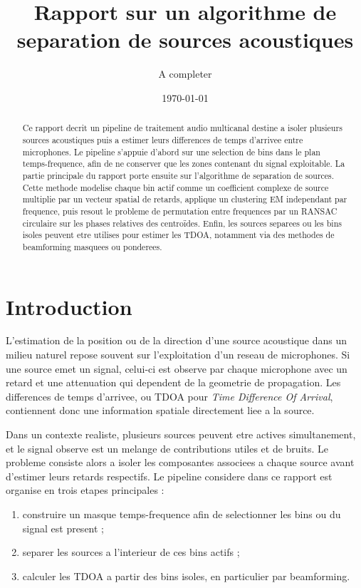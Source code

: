 \documentclass[11pt,a4paper]{article}
\title{Rapport sur un algorithme de separation de sources acoustiques}
\author{A completer}
\date{\today}
\begin{document}
\maketitle

\begin{abstract}
Ce rapport decrit un pipeline de traitement audio multicanal destine a isoler
plusieurs sources acoustiques puis a estimer leurs differences de temps
d'arrivee entre microphones. Le pipeline s'appuie d'abord sur une selection de
bins dans le plan temps-frequence, afin de ne conserver que les zones contenant
du signal exploitable. La partie principale du rapport porte ensuite sur
l'algorithme de separation de sources. Cette methode modelise chaque bin actif
comme un coefficient complexe de source multiplie par un vecteur spatial de
retards, applique un clustering EM independant par frequence, puis resout le
probleme de permutation entre frequences par un RANSAC circulaire sur les phases
relatives des centroïdes. Enfin, les sources separees ou les bins isoles peuvent etre
utilises pour estimer les TDOA, notamment via des methodes de beamforming
masquees ou ponderees.
\end{abstract}

\tableofcontents
\newpage

\section{Introduction}

L'estimation de la position ou de la direction d'une source acoustique dans un
milieu naturel repose souvent sur l'exploitation d'un reseau de microphones. Si
une source emet un signal, celui-ci est observe par chaque microphone avec un
retard et une attenuation qui dependent de la geometrie de propagation. Les
differences de temps d'arrivee, ou TDOA pour \emph{Time Difference Of Arrival},
contiennent donc une information spatiale directement liee a la source.

Dans un contexte realiste, plusieurs sources peuvent etre actives
simultanement, et le signal observe est un melange de contributions utiles et de
bruits. Le probleme consiste alors a isoler les composantes associees a chaque
source avant d'estimer leurs retards respectifs. Le pipeline considere dans ce
rapport est organise en trois etapes principales :

\begin{enumerate}
  \item construire un masque temps-frequence afin de selectionner les bins ou
  du signal est present ;
  \item separer les sources a l'interieur de ces bins actifs ;
  \item calculer les TDOA a partir des bins isoles, en particulier par
  beamforming.
\end{enumerate}
\end{document}
